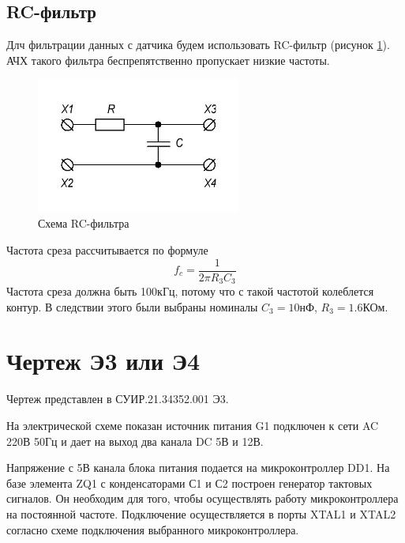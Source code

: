 \subsection{RC-фильтр}
Длч фильтрации данных с датчика будем использовать RC-фильтр (рисунок \ref{fig:filter}). АЧХ такого фильтра беспрепятственно пропускает низкие частоты.
\begin{figure}[ht]
	\centering
	\includegraphics[width=0.6\textwidth]{./images/RC_filt.jpg}
	\caption{Схема RC-фильтра}
	\label{fig:filter}
\end{figure}
Частота среза рассчитывается по формуле
\begin{equation}
    \label{eq:filter}
    f_{c} = \frac{1}{2 \pi R_3 C_3}
\end{equation}
Частота среза должна быть 100кГц, потому что с такой частотой колеблется контур. В следствии этого были выбраны номиналы \(C_3 = 10\)нФ, \(R_3 = 1.6\)КОм.

\newpage
\section{Чертеж Э3 или Э4}
Чертеж представлен в СУИР.21.34352.001 Э3.

На электрической схеме показан источник питания G1 подключен к сети AC 220В 50Гц и дает на выход два канала DC 5В и 12В.

Напряжение с 5В канала блока питания подается на микроконтроллер DD1. На базе элемента ZQ1 с конденсаторами С1 и С2 построен генератор тактовых сигналов. Он необходим для того, чтобы осуществлять работу микроконтроллера на постоянной частоте. Подключение осуществляется в порты XTAL1 и XTAL2 согласно схеме подключения выбранного микроконтроллера.

